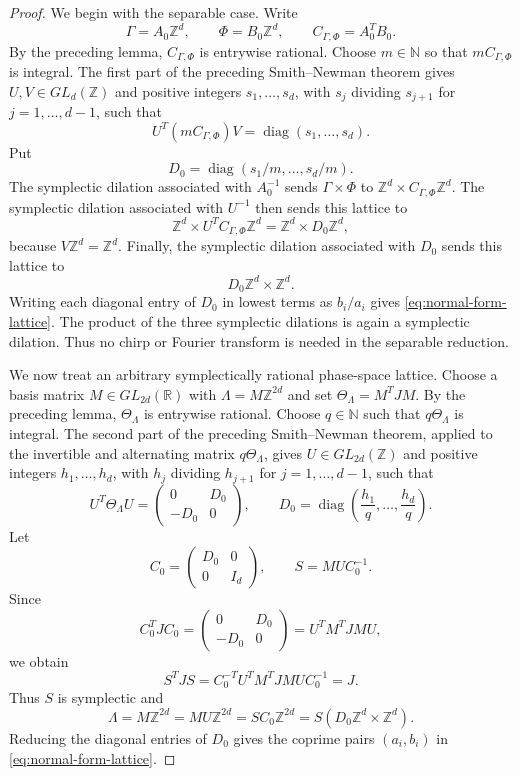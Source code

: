 \documentclass[11pt,reqno]{amsart}
\numberwithin{equation}{section}
\theoremstyle{definition}
\theoremstyle{remark}
\newcommand{\R}{\mathbb R}
\newcommand{\Z}{\mathbb Z}
\newcommand{\N}{\mathbb N}
\begin{document}
\begin{proof}
We begin with the separable case.  Write
\[
 \Gamma=A_0\Z^d,
 \qquad
 \Phi=B_0\Z^d,
 \qquad
 C_{\Gamma,\Phi}=A_0^TB_0.
\]
By the preceding lemma, $C_{\Gamma,\Phi}$ is entrywise rational.  Choose
$m\in\N$ so that $mC_{\Gamma,\Phi}$ is integral.  The first part of the preceding Smith--Newman theorem gives
$U,V\in GL_d(\Z)$ and positive integers
$s_1,\ldots,s_d$, with $s_j$ dividing $s_{j+1}$ for
$j=1,\ldots,d-1$, such that
\[
 U^T(mC_{\Gamma,\Phi})V
 =\operatorname{diag}(s_1,\ldots,s_d).
\]
Put
\[
 D_0=\operatorname{diag}(s_1/m,\ldots,s_d/m).
\]
The symplectic dilation associated with $A_0^{-1}$ sends
$\Gamma\times\Phi$ to
$\Z^d\times C_{\Gamma,\Phi}\Z^d$.  The symplectic dilation associated with
$U^{-1}$ then sends this lattice to
\[
 \Z^d\times U^TC_{\Gamma,\Phi}\Z^d
 =\Z^d\times D_0\Z^d,
\]
because $V\Z^d=\Z^d$.  Finally, the symplectic dilation associated with
$D_0$ sends this lattice to
\[
                         D_0\Z^d\times\Z^d.
\]
Writing each diagonal entry of $D_0$ in lowest terms as $b_i/a_i$ gives
\eqref{eq:normal-form-lattice}.  The product of the three symplectic
dilations is again a symplectic dilation.  Thus no chirp or Fourier
transform is needed in the separable reduction.

We now treat an arbitrary symplectically rational phase-space lattice.
Choose a basis matrix $M\in GL_{2d}(\R)$ with
$\Lambda=M\Z^{2d}$ and set $\Theta_\Lambda=M^TJM$.  By the preceding
lemma, $\Theta_\Lambda$ is entrywise rational.  Choose $q\in\N$ such that
$q\Theta_\Lambda$ is integral.  The second part of the preceding Smith--Newman theorem, applied to the invertible and alternating matrix 
$q\Theta_\Lambda$, gives
$U\in GL_{2d}(\Z)$ and positive integers
$h_1,\ldots,h_d$, with $h_j$ dividing $h_{j+1}$ for
$j=1,\ldots,d-1$, such that
\[
 U^T\Theta_\Lambda U
 =\begin{pmatrix}0&D_0\\-D_0&0\end{pmatrix},
 \qquad
 D_0=\operatorname{diag}\left(\frac{h_1}{q},\ldots,
                               \frac{h_d}{q}\right).
\]
Let
\[
 C_0=\begin{pmatrix}D_0&0\\0&I_d\end{pmatrix},
 \qquad
 S=MUC_0^{-1}.
\]
Since
\[
 C_0^TJC_0
 =\begin{pmatrix}0&D_0\\-D_0&0\end{pmatrix}
 =U^TM^TJMU,
\]
we obtain
\[
 S^TJS=C_0^{-T}U^TM^TJMU C_0^{-1}=J.
\]
Thus $S$ is symplectic and
\[
 \Lambda=M\Z^{2d}
 =MU\Z^{2d}
 =SC_0\Z^{2d}
 =S(D_0\Z^d\times\Z^d).
\]
Reducing the diagonal entries of $D_0$ gives the coprime pairs
$(a_i,b_i)$ in \eqref{eq:normal-form-lattice}.


\end{proof}
\end{document}
